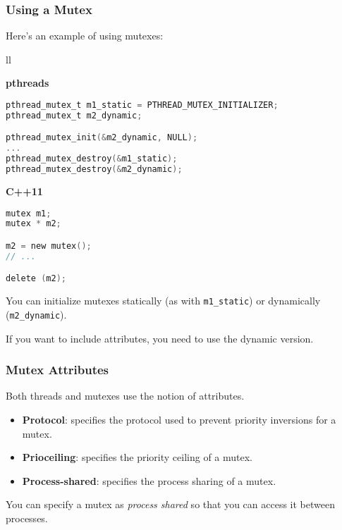 \begin{frame}[fragile]
\frametitle{Using a Mutex}

  Here's an example of using mutexes:
    
    \begin{tabular}{ll}
      \begin{minipage}{.65\textwidth}
        {\bf pthreads}
{\scriptsize
  \begin{lstlisting}[language=C]
pthread_mutex_t m1_static = PTHREAD_MUTEX_INITIALIZER;
pthread_mutex_t m2_dynamic;

pthread_mutex_init(&m2_dynamic, NULL);
...
pthread_mutex_destroy(&m1_static);
pthread_mutex_destroy(&m2_dynamic);
  \end{lstlisting}
  }
      \end{minipage}
      \begin{minipage}{.35\textwidth}

        {\bf C++11}
{\scriptsize
  \begin{lstlisting}[language=C]
mutex m1;
mutex * m2;

m2 = new mutex();
// ...

delete (m2);
  \end{lstlisting}
  }
      \end{minipage}
    \end{tabular}

You can initialize mutexes statically (as with {\tt m1\_static}) or
dynamically ({\tt m2\_dynamic}). 

If you want to include attributes,
you need to use the dynamic version.

\end{frame}



\begin{frame}
\frametitle{Mutex Attributes}

 Both threads and mutexes use the notion of attributes.
 

  \begin{itemize}
    \item {\bf Protocol}: specifies the protocol used to prevent priority
      inversions for a mutex.
    \item {\bf Prioceiling}: specifies the priority ceiling of a mutex.
    \item {\bf Process-shared}: specifies the process sharing of a mutex.
  \end{itemize}
  
  You can specify a mutex as {\it process shared} so that you can access it
  between processes.

\end{frame}


